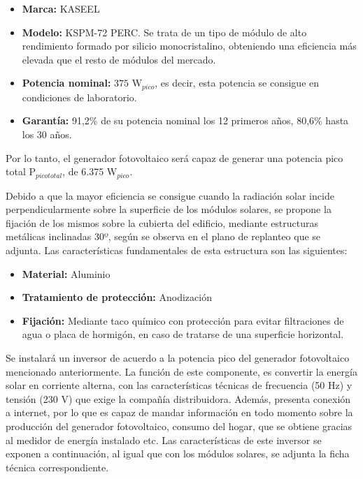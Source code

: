 \begin{spacing}{1.2}
\begin{itemize}\itemsep1pt \parskip0pt 
\item \textbf{Marca:} KASEEL 
\item \textbf{Modelo:} KSPM-72 PERC. Se trata de un tipo de módulo de alto rendimiento formado por silicio monocristalino, obteniendo una eficiencia más elevada que el resto de módulos del mercado.
\item \textbf{Potencia nominal:} $375$ W$_{pico}$, es decir, esta potencia se consigue en condiciones de laboratorio.
\item \textbf{Garantía:} 91,2\% de su potencia nominal los 12 primeros años, 80,6\% hasta los 30 años.
\end{itemize}
				 
Por lo tanto, el generador fotovoltaico será capaz de generar una potencia pico total P$_{pico total}$, de 6.375 W$_{pico}$.

Debido a que la mayor eficiencia se consigue cuando la radiación solar incide perpendicularmente sobre la superficie de los módulos solares, se propone la fijación de los mismos sobre la cubierta del edificio, mediante estructuras metálicas inclinadas 30º, según se observa en el plano de replanteo que se adjunta. Las características fundamentales de esta estructura son las siguientes:

\begin{itemize}\itemsep1pt \parskip0pt 
\item \textbf{Material:} Aluminio 
\item \textbf{Tratamiento de protección:} Anodización
\item \textbf{Fijación:} Mediante taco químico con protección para evitar filtraciones de agua o placa de hormigón, en caso de tratarse de una superficie horizontal.
\end{itemize}

Se instalará un inversor de acuerdo a la potencia pico del generador fotovoltaico mencionado anteriormente. La función de este componente, es convertir la energía solar en corriente alterna, con las características técnicas de frecuencia (50 Hz) y tensión (230 V) que exige la compañía distribuidora. Además, presenta conexión a internet, por lo que es capaz de mandar información en todo momento sobre la producción del generador fotovoltaico, consumo del hogar, que se obtiene gracias al medidor de energía instalado etc. Las características de este inversor se exponen a continuación, al igual que con los módulos solares, se adjunta la ficha técnica correspondiente.


\end{spacing}
